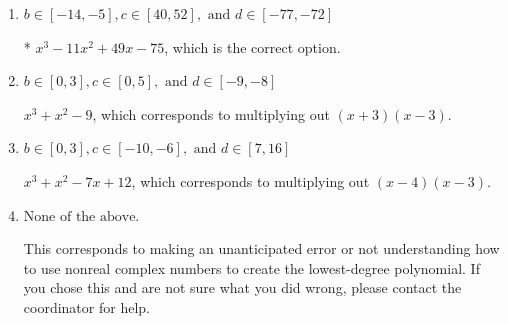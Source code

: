 \documentclass{extbook}[14pt]
\begin{document}
\begin{enumerate}
{\begin{enumerate}[label=\Alph*.]
$x^{3} +11 x^{2} +49 x + 75$, which corresponds to multiplying out $(x-(4 - 3 i))(x-(4 + 3 i))(x + 3)$.
\item \( b \in [-14, -5], c \in [40, 52], \text{ and } d \in [-77, -72] \)

* $x^{3} -11 x^{2} +49 x -75$, which is the correct option.
\item \( b \in [0, 3], c \in [0, 5], \text{ and } d \in [-9, -8] \)

$x^{3} + x^{2} -9$, which corresponds to multiplying out $(x + 3)(x -3)$.
\item \( b \in [0, 3], c \in [-10, -6], \text{ and } d \in [7, 16] \)

$x^{3} + x^{2} -7 x + 12$, which corresponds to multiplying out $(x -4)(x -3)$.
\item \( \text{None of the above.} \)

This corresponds to making an unanticipated error or not understanding how to use nonreal complex numbers to create the lowest-degree polynomial. If you chose this and are not sure what you did wrong, please contact the coordinator for help.
\end{enumerate}

}
\end{enumerate}
\end{document}
